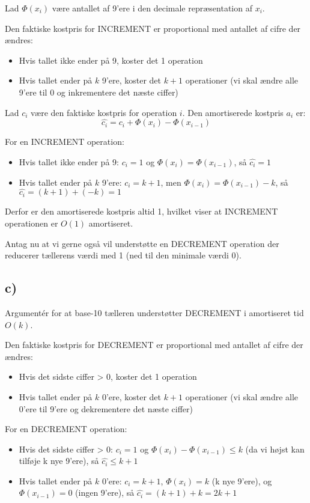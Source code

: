 \documentclass{article}
\theoremstyle{definition}
\begin{document}
Lad $\Phi(x_i)$ være antallet af 9'ere i den decimale repræsentation af $x_i$.

Den faktiske kostpris for INCREMENT er proportional med antallet af cifre der ændres:
\begin{itemize}
    \item Hvis tallet ikke ender på 9, koster det 1 operation
    \item Hvis tallet ender på $k$ 9'ere, koster det $k+1$ operationer (vi skal ændre alle 9'ere til 0 og inkrementere det næste ciffer)
\end{itemize}

Lad $c_i$ være den faktiske kostpris for operation $i$. Den amortiserede kostpris $a_i$ er:
\[ \hat{c_i} = c_i + \Phi(x_i) - \Phi(x_{i-1}) \]

For en INCREMENT operation:
\begin{itemize}
    \item Hvis tallet ikke ender på 9: $c_i = 1$ og $\Phi(x_i) = \Phi(x_{i-1})$, så $\hat{c_i} = 1$
    \item Hvis tallet ender på $k$ 9'ere: $c_i = k+1$, men $\Phi(x_i) = \Phi(x_{i-1}) - k$, så $\hat{c_i} = (k+1) + (-k) = 1$
\end{itemize}

Derfor er den amortiserede kostpris altid 1, hvilket viser at INCREMENT operationen er $O(1)$ amortiseret.

Antag nu at vi gerne også vil understøtte en DECREMENT operation der reducerer tællerens værdi med 1 (ned til den minimale værdi 0).

\subsection*{c)} Argumentér for at base-10 tælleren understøtter DECREMENT i amortiseret tid $O(k)$.

Den faktiske kostpris for DECREMENT er proportional med antallet af cifre der ændres:
\begin{itemize}
    \item Hvis det sidste ciffer > 0, koster det 1 operation
    \item Hvis tallet ender på $k$ 0'ere, koster det $k+1$ operationer (vi skal ændre alle 0'ere til 9'ere og dekrementere det næste ciffer)
\end{itemize}

For en DECREMENT operation:
\begin{itemize}
    \item Hvis det sidste ciffer > 0: $c_i = 1$ og $\Phi(x_i) - \Phi(x_{i-1}) \leq k$ (da vi højst kan tilføje k nye 9'ere), så $\hat{c_i} \leq k+1$
    \item Hvis tallet ender på $k$ 0'ere: $c_i = k+1$, $\Phi(x_i) = k$ (k nye 9'ere), og $\Phi(x_{i-1}) = 0$ (ingen 9'ere), så $\hat{c_i} = (k+1) + k = 2k+1$
\end{itemize}
\end{document}
